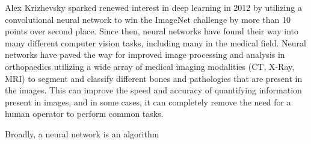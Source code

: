 \cite{krizhevskyImageNetClassificationDeep2017} Alex Krizhevsky sparked renewed interest in deep learning in 2012 by utilizing a convolutional neural network to win the ImageNet challenge \cite{russakovskyImageNetLargeScale2015} by more than 10 points over second place. Since then, neural networks have found their way into many different computer vision tasks, including many in the medical field. Neural networks have paved the way for improved image processing and analysis in orthopaedics utilizing a wide array of medical imaging modalities (CT, X-Ray, MRI) to segment and classify different bones and pathologies that are present in the images. This can improve the speed and accuracy of quantifying information present in images, and in some cases, it can completely remove the need for a human operator to perform common tasks.

Broadly, a neural network is an algorithm 




